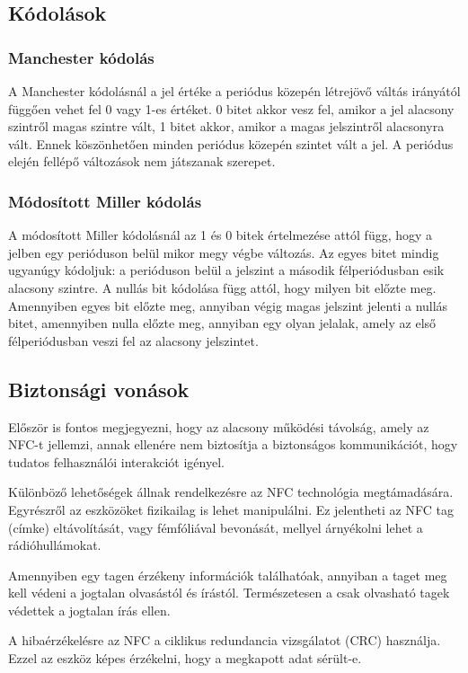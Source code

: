 \documentclass[12pt]{article}
\begin{document}
\subsection{Kódolások}

\subsubsection{Manchester kódolás}
A Manchester kódolásnál a jel értéke a periódus közepén létrejövő váltás irányától
függően vehet fel 0 vagy 1-es értéket. 0 bitet akkor vesz fel, amikor a jel
alacsony szintről magas szintre vált, 1 bitet akkor, amikor a magas jelszintről
alacsonyra vált. Ennek köszönhetően minden periódus közepén szintet vált a jel.
A periódus elején fellépő változások nem játszanak szerepet.

\subsubsection{Módosított Miller kódolás}
A módosított Miller kódolásnál az 1 és 0 bitek értelmezése attól függ, hogy
a jelben egy perióduson belül mikor megy végbe változás. Az egyes bitet
mindig ugyanúgy kódoljuk: a perióduson belül a jelszint a második félperiódusban
esik alacsony szintre. A nullás bit kódolása függ attól, hogy milyen bit előzte meg.
Amennyiben egyes bit előzte meg, annyiban végig magas jelszint jelenti a nullás
bitet, amennyiben nulla előzte meg, annyiban egy olyan jelalak, amely az első
félperiódusban veszi fel az alacsony jelszintet.

\subsection{Biztonsági vonások}
Először is fontos megjegyezni, hogy az alacsony működési távolság, amely az NFC-t
jellemzi, annak ellenére nem biztosítja a biztonságos kommunikációt, hogy tudatos
felhasználói interakciót igényel.

Különböző lehetőségek állnak rendelkezésre az NFC technológia megtámadására.
Egyrészről az eszközöket fizikailag is lehet manipulálni. Ez jelentheti az NFC
tag (címke) eltávolítását, vagy fémfóliával bevonását, mellyel árnyékolni lehet
a rádióhullámokat.

Amennyiben egy tagen érzékeny információk találhatóak, annyiban a taget meg kell
védeni a  jogtalan olvasástól és írástól. Természetesen a csak olvasható tagek
védettek a jogtalan írás ellen.

A hibaérzékelésre az NFC a ciklikus redundancia vizsgálatot (CRC) használja.
Ezzel az eszköz képes érzékelni, hogy a megkapott adat sérült-e. 
\end{document}
